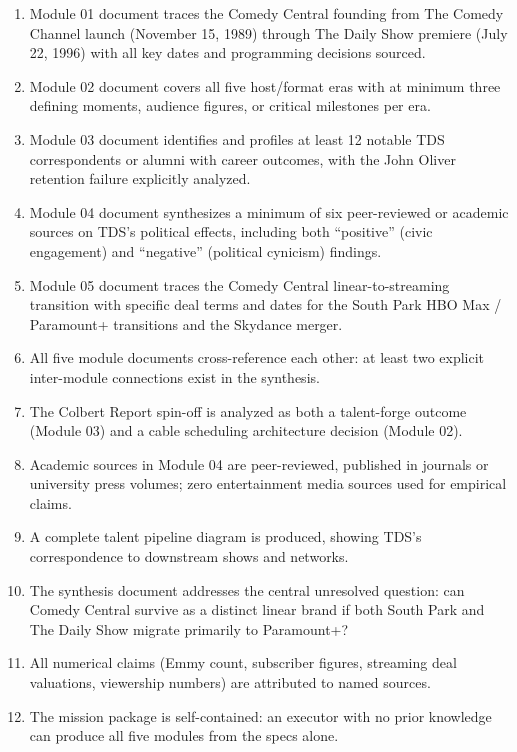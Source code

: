 \documentclass[11pt,letterpaper]{article}
\begin{document}
\begin{enumerate}
  \item Module 01 document traces the Comedy Central founding from The Comedy Channel launch (November 15, 1989) through The Daily Show premiere (July 22, 1996) with all key dates and programming decisions sourced.
  \item Module 02 document covers all five host/format eras with at minimum three defining moments, audience figures, or critical milestones per era.
  \item Module 03 document identifies and profiles at least 12 notable TDS correspondents or alumni with career outcomes, with the John Oliver retention failure explicitly analyzed.
  \item Module 04 document synthesizes a minimum of six peer-reviewed or academic sources on TDS's political effects, including both ``positive'' (civic engagement) and ``negative'' (political cynicism) findings.
  \item Module 05 document traces the Comedy Central linear-to-streaming transition with specific deal terms and dates for the South Park HBO Max / Paramount+ transitions and the Skydance merger.
  \item All five module documents cross-reference each other: at least two explicit inter-module connections exist in the synthesis.
  \item The Colbert Report spin-off is analyzed as both a talent-forge outcome (Module 03) and a cable scheduling architecture decision (Module 02).
  \item Academic sources in Module 04 are peer-reviewed, published in journals or university press volumes; zero entertainment media sources used for empirical claims.
  \item A complete talent pipeline diagram is produced, showing TDS's correspondence to downstream shows and networks.
  \item The synthesis document addresses the central unresolved question: can Comedy Central survive as a distinct linear brand if both South Park and The Daily Show migrate primarily to Paramount+?
  \item All numerical claims (Emmy count, subscriber figures, streaming deal valuations, viewership numbers) are attributed to named sources.
  \item The mission package is self-contained: an executor with no prior knowledge can produce all five modules from the specs alone.
\end{enumerate}
\end{document}
